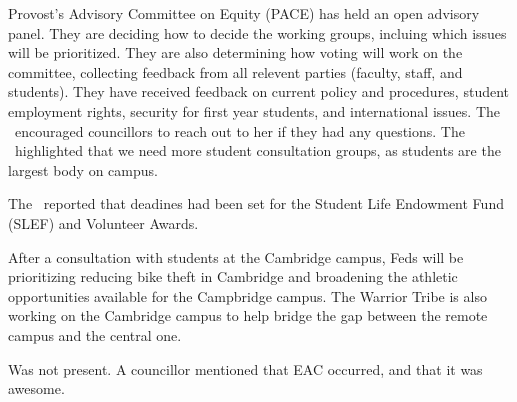 \begin{information}
    Provost's Advisory Committee on Equity (PACE) has held an open advisory 
    panel. They are deciding how to decide the working groups, incluing which
    issues will be prioritized. They are also determining how voting will work
    on the committee, collecting feedback from all relevent parties (faculty,
    staff, and students). They have received feedback on current policy and
    procedures, student employment rights, security for first year students, 
    and international issues. The \vpi\ encouraged councillors to reach out
    to her if they had any questions. The \vpi\ highlighted that we need more 
    student consultation groups, as students are the largest body on campus. 

    The \vpi\ reported that deadines had been set for the Student Life
    Endowment Fund (SLEF) and Volunteer Awards.

    After a consultation with students at the Cambridge campus, Feds will be
    prioritizing reducing bike theft in Cambridge and broadening the athletic
    opportunities available for the Campbridge campus. The Warrior Tribe is 
    also working on the Cambridge campus to help bridge the gap between the
    remote campus and the central one.  
    
\end{information}

\begin{information}

    Was not present. A councillor mentioned that EAC occurred, and that it was
    awesome. 

\end{information}

